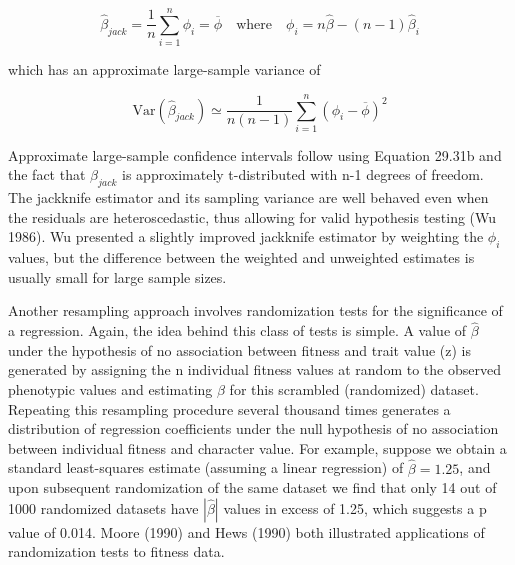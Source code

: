 \documentclass{article}
\begin{document}
\begin{equation}
\widehat{\beta}_{j a c k}=\frac{1}{n}\sum_{i=1}^{n}\phi_{i}=\overline{\phi}\quad\mathrm{w h e r e}\quad\phi_{i}=n\widehat{\beta}-(n-1)\widehat{\beta}_{i}
\tag{29.31a}
\label{eq:29_31a}
\end{equation}

which has an approximate large-sample variance of

\begin{equation}
\mathrm{Var}\left(\widehat{\beta}_{jack}\right)\simeq\frac{1}{n(n-1)}\sum_{i=1}^{n}(\phi_{i}-\overline{\phi})^{2}
\tag{29.31b}
\label{eq:29_31b}
\end{equation}

Approximate large-sample confidence intervals follow using Equation 29.31b and the fact that  $ \beta_{jack} $ is approximately t-distributed with n-1 degrees of freedom. The jackknife estimator and its sampling variance are well behaved even when the residuals are heteroscedastic, thus allowing for valid hypothesis testing (Wu 1986). Wu presented a slightly improved jackknife estimator by weighting the  $ \phi_i $ values, but the difference between the weighted and unweighted estimates is usually small for large sample sizes.

Another resampling approach involves randomization tests for the significance of a regression. Again, the idea behind this class of tests is simple. A value of  $ \widehat{\beta} $ under the hypothesis of no association between fitness and trait value (z) is generated by assigning the n individual fitness values at random to the observed phenotypic values and estimating  $ \beta $ for this scrambled (randomized) dataset. Repeating this resampling procedure several thousand times generates a distribution of regression coefficients under the null hypothesis of no association between individual fitness and character value. For example, suppose we obtain a standard least-squares estimate (assuming a linear regression) of  $ \widehat{\beta} = 1.25 $, and upon subsequent randomization of the same dataset we find that only 14 out of 1000 randomized datasets have  $ |\widehat{\beta}| $ values in excess of 1.25, which suggests a p value of 0.014. Moore (1990) and Hews (1990) both illustrated applications of randomization tests to fitness data.
\end{document}
